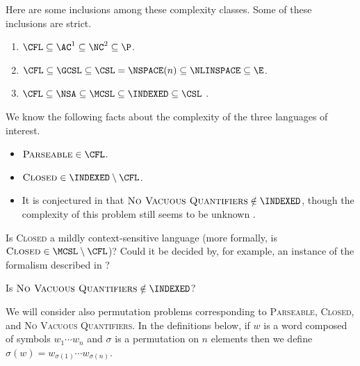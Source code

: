 \documentclass{article}
\newcommand{\lb}{\left\{} %
\newcommand{\rb}{\right\}} %
\newcommand{\st}{\,\middle|\,} %
\newcommand{\CLOSED}{\textsc{Closed}}
\newcommand{\PARSEABLE}{\textsc{Parseable}}
\newcommand{\NVQ}{\textsc{No Vacuous Quantifiers}}
\begin{document}
Here are some inclusions among these complexity classes.
Some of these inclusions are strict.
\begin{theorem}\mbox{}
  \begin{enumerate}
  \item $\CFL\subseteq\AC^1\subseteq\NC^2\subseteq\P$.
  \item $\CFL\subseteq\GCSL\subseteq\CSL=\NSPACE(n)\subseteq\NLINSPACE\subseteq\E$.
  \item $\CFL\subseteq\NSA\subseteq\MCSL\subseteq\INDEXED\subseteq\CSL$ \autocite{hu79}.
  \end{enumerate}
\end{theorem}

We know the following facts about the complexity of the three languages of interest.
\begin{itemize}
\item $\PARSEABLE \in \CFL$.
\item $\CLOSED \in \INDEXED \setminus \CFL$. \autocite{mp87}
\item It is conjectured in \autocite{mp87} that $\NVQ \notin \INDEXED$, though the complexity of this problem still seems to be unknown \autocite{potts}.
\end{itemize}


\begin{openproblem}
  Is \CLOSED{} a mildly context-sensitive language (more formally, is $\CLOSED \in \MCSL \setminus \CFL$)? Could it be decided by, for example, an instance of the formalism described in \autocite{kallmeyer}?
\end{openproblem}

\begin{openproblem}
  Is $\NVQ \notin \INDEXED$?
\end{openproblem}

We will consider also permutation problems corresponding to \PARSEABLE, \CLOSED, and \NVQ.
In the definitions below, if $w$ is a word composed of symbols $w_1 \dotsb w_n$ and $\sigma$ is a permutation on $n$ elements then we define $\sigma(w) = w_{\sigma(1)} \dotsb w_{\sigma(n)}$.
\end{document}
